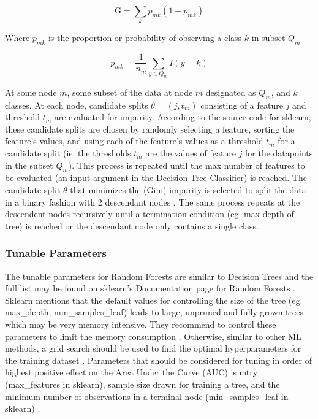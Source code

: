 \begin{equation}
    \label{eq:gini}
    \text{G} = \sum_k p_{mk}(1-p_{mk})
\end{equation}

Where $p_{mk}$ is the proportion or probability of observing a class $k$ in subset $Q_m$

\begin{equation}
    p_{mk} = \frac{1}{n_m} \sum_{y \in Q_m}I(y=k)
\end{equation}

At some node $m$, some subset of the data at node $m$ designated as $Q_m$, and $k$ classes. At each node, candidate splits $\theta = (j, t_m)$ consisting of a feature $j$ and threshold $t_m$ are evaluated for impurity. According to the source code for sklearn, these candidate splits are chosen by randomly selecting a feature, sorting the feature's values, and using each of the feature's values as a threshold $t_m$ for a candidate split (ie. the thresholds $t_m$ are the values of feature $j$ for the datapoints in the subset $Q_m$). This process is repeated until the max number of features to be evaluated (an input argument in the Decision Tree Classifier) is reached. The candidate split $\theta$ that minimizes the (Gini) impurity is selected to split the data in a binary fashion with 2 descendant nodes \cite{ScikitlearnSklearnTree}. The same process repeats at the descendent nodes recursively until a termination condition (eg. max depth of tree) is reached or the descendant node only contains a single class.

\subsubsection{Tunable Parameters}
The tunable parameters for Random Forests are similar to Decision Trees and the full list may be found on sklearn's Documentation page for Random Forests \cite{RandomForestClassifier}. Sklearn mentions that the default values for controlling the size of the tree (eg. max\_depth, min\_samples\_leaf) leads to large, unpruned and fully grown trees which may be very memory intensive. They recommend to control these parameters to limit the memory consumption \cite{RandomForestClassifier}. Otherwise, similar to other ML methods, a grid search should be used to find the optimal hyperparameters for the training dataset \cite{probstHyperparametersTuningStrategies2019}. Parameters that should be considered for tuning in order of highest positive effect on the Area Under the Curve (AUC) is mtry (max\_features in sklearn), sample size drawn for training a tree, and the minimum number of observations in a terminal node (min\_samples\_leaf in sklearn) \cite{probstHyperparametersTuningStrategies2019}.

